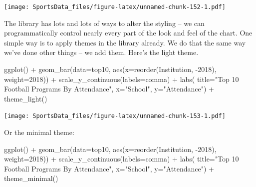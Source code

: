 \documentclass[
]{book}
\newenvironment{Shaded}{\begin{snugshade}}{\end{snugshade}}
\newcommand{\AttributeTok}[1]{\textcolor[rgb]{0.77,0.63,0.00}{#1}}
\newcommand{\FunctionTok}[1]{\textcolor[rgb]{0.00,0.00,0.00}{#1}}
\newcommand{\NormalTok}[1]{#1}
\newcommand{\SpecialCharTok}[1]{\textcolor[rgb]{0.00,0.00,0.00}{#1}}
\newcommand{\StringTok}[1]{\textcolor[rgb]{0.31,0.60,0.02}{#1}}
\begin{document}
\texttt{[image: SportsData\_files/figure-latex/unnamed-chunk-152-1.pdf]}

The library has lots and lots of ways to alter the styling -- we can programmatically control nearly every part of the look and feel of the chart. One simple way is to apply themes in the library already. We do that the same way we've done other things -- we add them. Here's the light theme.

\begin{Shaded}
\begin{Highlighting}[]
\FunctionTok{ggplot}\NormalTok{() }\SpecialCharTok{+} 
  \FunctionTok{geom\_bar}\NormalTok{(}\AttributeTok{data=}\NormalTok{top10, }\FunctionTok{aes}\NormalTok{(}\AttributeTok{x=}\FunctionTok{reorder}\NormalTok{(Institution, }\SpecialCharTok{{-}}\StringTok{\textasciigrave{}}\AttributeTok{2018}\StringTok{\textasciigrave{}}\NormalTok{), }\AttributeTok{weight=}\StringTok{\textasciigrave{}}\AttributeTok{2018}\StringTok{\textasciigrave{}}\NormalTok{)) }\SpecialCharTok{+} 
  \FunctionTok{scale\_y\_continuous}\NormalTok{(}\AttributeTok{labels=}\NormalTok{comma) }\SpecialCharTok{+} 
  \FunctionTok{labs}\NormalTok{(}
    \AttributeTok{title=}\StringTok{"Top 10 Football Programs By Attendance"}\NormalTok{, }
    \AttributeTok{x=}\StringTok{"School"}\NormalTok{, }
    \AttributeTok{y=}\StringTok{"Attendance"}\NormalTok{) }\SpecialCharTok{+} 
  \FunctionTok{theme\_light}\NormalTok{()}
\end{Highlighting}
\end{Shaded}

\texttt{[image: SportsData\_files/figure-latex/unnamed-chunk-153-1.pdf]}

Or the minimal theme:

\begin{Shaded}
\begin{Highlighting}[]
\FunctionTok{ggplot}\NormalTok{() }\SpecialCharTok{+} 
  \FunctionTok{geom\_bar}\NormalTok{(}\AttributeTok{data=}\NormalTok{top10, }\FunctionTok{aes}\NormalTok{(}\AttributeTok{x=}\FunctionTok{reorder}\NormalTok{(Institution, }\SpecialCharTok{{-}}\StringTok{\textasciigrave{}}\AttributeTok{2018}\StringTok{\textasciigrave{}}\NormalTok{), }\AttributeTok{weight=}\StringTok{\textasciigrave{}}\AttributeTok{2018}\StringTok{\textasciigrave{}}\NormalTok{)) }\SpecialCharTok{+} 
  \FunctionTok{scale\_y\_continuous}\NormalTok{(}\AttributeTok{labels=}\NormalTok{comma) }\SpecialCharTok{+} 
  \FunctionTok{labs}\NormalTok{(}
    \AttributeTok{title=}\StringTok{"Top 10 Football Programs By Attendance"}\NormalTok{, }
    \AttributeTok{x=}\StringTok{"School"}\NormalTok{, }
    \AttributeTok{y=}\StringTok{"Attendance"}\NormalTok{) }\SpecialCharTok{+} 
  \FunctionTok{theme\_minimal}\NormalTok{()}
\end{Highlighting}
\end{Shaded}
\end{document}
